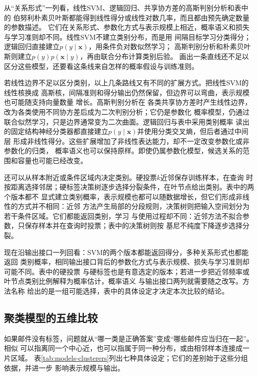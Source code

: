 从“关系形式”一列看，线性SVM、逻辑回归、共享协方差的高斯判别分析和表中的
伯努利朴素贝叶斯都能得到线性得分或线性对数几率，而且都由预先确定数量的参数描述。
它们在关系形式、参数化方式与表示规模上相近，概率语义和损失与学习准则却不同。线性SVM不建立类别分布，而是用
间隔目标学习分类得分；逻辑回归直接建立$p(y\mid\bm{x})$，用条件负对数似然学习；
高斯判别分析和朴素贝叶斯则建立$p(y)p(\bm{x}\mid y)$，再由联合分布计算类别后验。
画出一条直线还不足以区分这些模型，还要看这条线来自怎样的概率假设与训练准则。

若线性边界不足以区分类别，以上几条路线又有不同的扩展方式。把线性SVM的线性核换成
高斯核，间隔准则和得分输出仍然保留，但边界可以弯曲，表示规模也可能随支持向量数量
增长。高斯判别分析在
各类共享协方差时产生线性边界，改为各类使用不同协方差后成为二次判别分析；它仍是参数化
概率模型，仍通过联合似然学习，只是边界通常变为二次曲面。逻辑回归与表中采用类别概率
读出的固定结构神经分类器都直接建立$p(y\mid\bm{x})$并使用分类交叉熵，但后者通过中间层
形成非线性得分。这些扩展增加了非线性表达能力，却不一定改变参数化或非参数化的归类，
概率语义也可以保持原样。即使仍属参数化模型，候选关系的范围和容量也可能已经改变。

还可以从样本附近或条件区域内决定类别。硬投票$k$近邻保存训练样本，在查询
时按距离选择邻居；硬标签决策树逐步选择分裂条件，在叶节点给出类别。表中的两个版本都不
显式建立类别概率，表示规模也都可以随数据增长，但它们形成非线性的方式并不相同：近邻
方法产生局部的分段规则，决策树则把输入空间划分为若干条件区域。它们都能返回类别，学习
与使用过程却不同：近邻方法不拟合参数，只保存样本并在查询时投票；表中的决策树则按
基尼不纯度下降逐步选择分裂。

现在沿输出接口一列回看：SVM的两个版本都能返回得分，多种关系形式也都能返回
类别概率，相同输出接口背后的参数化方式与表示规模、损失与学习准则却可能不同。表中的硬投票
与硬标签也是有意选定的版本；若进一步把近邻频率或叶节点类别比例解释为概率估计，概率语义
与输出接口两列就需要随之改写。方法名称
给出的是一组可能选择，表中的具体设定才决定本次比较的结论。

\FloatBarrier
\subsection{聚类模型的五维比较}
\label{sec:models-clustering-grid}

如果邮件没有标签，问题就从“哪一类是正确答案”变成“哪些邮件应当归在一起”。相似
可以指离同一个中心近，也可以指属于同一种分布，或由相邻样本连接成一片区域。
表\ref{tab:models-clusterers}列出七种具体设定；它们的差别始于这些分组依据，并进一步
影响表示规模与输出。

